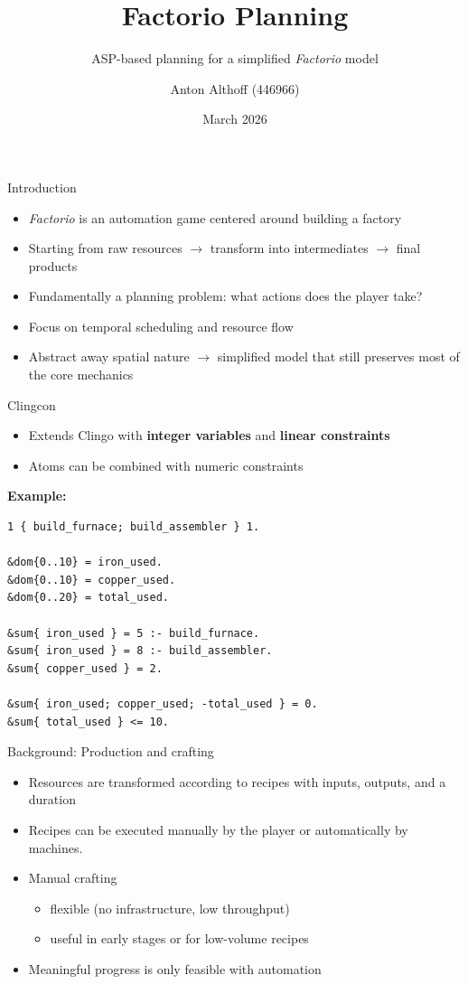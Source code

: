 \documentclass[aspectratio=169]{beamer}
\title{Factorio Planning}
\subtitle{ASP-based planning for a simplified \textit{Factorio} model}
\author{Anton Althoff (446966)}
\date{March 2026}
\newcommand{\factorio}[1]{\textit{#1}}
\begin{document}
\begin{frame}
  \titlepage
\end{frame}

\begin{frame}{Introduction}
\begin{itemize}
    \item \factorio{Factorio} is an automation game centered around building a factory
    \item Starting from raw resources $\to$ transform into intermediates $\to$ final products
    \item Fundamentally a planning problem: what actions does the player take?
    \item Focus on temporal scheduling and resource flow
    \item Abstract away spatial nature $\to$ simplified model that still preserves most of the core mechanics
\end{itemize}
\end{frame}

\begin{frame}[fragile]{Clingcon}
\begin{itemize}
    \item Extends Clingo with \textbf{integer variables} and \textbf{linear constraints}
    \item Atoms can be combined with numeric constraints
\end{itemize}

\vspace{0.5em}
\textbf{Example:}
\begin{lstlisting}[language=asp]
1 { build_furnace; build_assembler } 1.

&dom{0..10} = iron_used.
&dom{0..10} = copper_used.
&dom{0..20} = total_used.

&sum{ iron_used } = 5 :- build_furnace.
&sum{ iron_used } = 8 :- build_assembler.
&sum{ copper_used } = 2.

&sum{ iron_used; copper_used; -total_used } = 0.
&sum{ total_used } <= 10.
\end{lstlisting}
\end{frame}

\begin{frame}{Background: Production and crafting}
\begin{itemize}
    \item Resources are transformed according to recipes with inputs, outputs, and a duration
    \item Recipes can be executed manually by the player or automatically by machines.
    \item Manual crafting 
    \begin{itemize}
        \item flexible (no infrastructure, low throughput)
        \item useful in early stages or for low-volume recipes
    \end{itemize}
    \item Meaningful progress is only feasible with automation
\end{itemize}
\end{frame}
\end{document}
